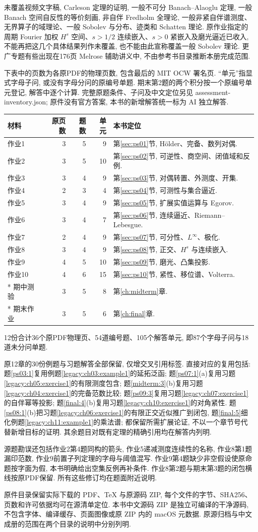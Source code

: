 未覆盖视频文字稿, Carleson 定理的证明, 一般不可分 Banach--Alaoglu 定理, 一般 Banach 空间自反性的等价刻画, 非自伴 Fredholm 全理论, 一般非紧自伴谱测度、无界算子的域理论、一般 Sobolev 与分布、迹类和 Schatten 理论. 原作业指定的周期 Fourier 加权 $H^s$ 空间、$s>1/2$ 连续嵌入、$s>0$ 紧嵌入及磨光逼近已收入, 不能再把这几个具体结果列作未覆盖, 也不能由此宣称覆盖一般 Sobolev 理论. 更广专题有些出现在176页 Melrose 辅助讲义中, 不由参考书目录推断本册完成范围.

下表中的页数为各原PDF的物理页数, 包含最后的 MIT OCW 署名页. “单元”指显式字母子问, 或没有字母分问的原编号单题. 期末第2题的两个积分按一个原编号单元登记, 解答中逐个计算. 完整原题条件、子问及中文定位另见 assessment-inventory.json; 原件没有官方答案, 本书的新增解答统一标为 AI 独立解答.
\begin{longtable}{p{32mm}r r r p{63mm}}
\toprule
材料 & 原页数 & 题数 & 单元 & 本书定位\\
\midrule\endhead
作业1 & 3 & 5 & 9 & 第\ref{sec:ps01}节, Hölder、完备、数列对偶.\\
作业2 & 3 & 5 & 10 & 第\ref{sec:ps02}节, 可逆性、商空间、闭值域和反例.\\
作业3 & 3 & 4 & 9 & 第\ref{sec:ps03}节, 对偶转置、外测度、开集.\\
作业4 & 2 & 3 & 4 & 第\ref{sec:ps04}节, 可测性与集合逼近.\\
作业5 & 3 & 4 & 9 & 第\ref{sec:ps05}节, 扩展实值运算与 Egorov.\\
作业6 & 3 & 4 & 7 & 第\ref{sec:ps06}节, 连续逼近、Riemann--Lebesgue.\\
作业7 & 2 & 4 & 9 & 第\ref{sec:ps07}节, 可分性、$L^\infty$、极化.\\
作业8 & 3 & 4 & 9 & 第\ref{sec:ps08}节, 正交、$H^s$ 与连续嵌入.\\
作业9 & 4 & 5 & 10 & 第\ref{sec:ps09}节, 磨光、凸集投影.\\
作业10 & 4 & 6 & 15 & 第\ref{sec:ps10}节, 紧性、移位谱、Volterra.\\*
期中测验 & 3 & 5 & 8 & 第\ref{ch:midterm}章.\\*
期末作业 & 3 & 5 & 6 & 第\ref{ch:final}章.\\
\bottomrule
\end{longtable}
12份合计36个原PDF物理页、54道编号题、105个解答单元, 即87个字母子问与18道未分问单题.

原12章的30份例题与习题解答全部保留, 仅增交叉引用标签. 直接对应的复用包括: 题\ref{ps03:1}复用例题\ref{legacy:ch03:example1}的延拓泛函; 题\ref{ps07:1}(a)复用习题\ref{legacy:ch05:exercise1}的有限测度包含; 题\ref{midterm:3}(b)复用习题\ref{legacy:ch04:exercise1}的完备范数比较; 题\ref{ps09:3}复用习题\ref{legacy:ch07:exercise1}的自伴幂等投影; 题\ref{final:4}(b)复用习题\ref{legacy:ch10:exercise1}的对角紧性. 题\ref{ps08:1}(b)把习题\ref{legacy:ch06:exercise1}的有限正交近似推广到闭包, 题\ref{final:5}细化例题\ref{legacy:ch11:example1}的乘法谱; 都保留所需扩展论证, 不以一个章节号代替新增目标的证明. 其余题目对既有定理的精确引用均在解答内列明.

源题勘误还包括作业2第4题同构的箭头, 作业5递减测度连续性的名称, 作业8第1题漏印范数, 作业9前置子列定理的字母与阈值混写. 作业9第4题缺少非空假设使原命题按字面为假, 本书明确给出空集反例再补条件. 作业8第2题与期末第3题的闭包横线按原PDF保留. 所有这些修订均在题面附近说明.

原件目录保留实际下载的 PDF、TeX 与原源码 ZIP, 每个文件的字节、SHA256、页数和许可依据均可在源清单定位. 本书中文源码 ZIP 是独立可编译的干净源码, 不包含字体、编译缓存、页面图像或原 ZIP 内的 macOS 元数据. 原源归档与中文成册的范围在两个目录的说明中分别列明.
